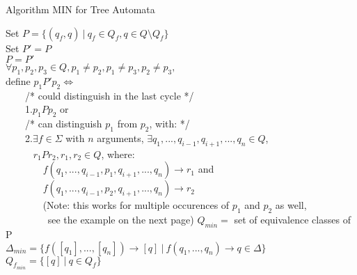 \documentclass{llncs}
\begin{document}
\begin{definition}{Algorithm MIN for Tree Automata} \cite{martens-uni-dortmund-lecture02}\\
	\begin{algorithm}[H]
		Set \(P = \{(q_f, q)~|~q_f \in Q_f, q \in Q \setminus Q_f\}\)\\
		Set \(P' = P\)\\
		 {
			\(P = P'\)\\
			\(\forall p_1, p_2, p_3 \in Q, p_1 \neq p_2, p_1 \neq p_3, p_2 \neq p_3,\)\\
			define \(p_1P'p_2 \iff\)\\
			~~~~/* could distinguish in the last cycle */\\
			~~~~1.\(p_1Pp_2\) or\\
			~~~~/* can distinguish \(p_1\) from \(p_2\), with: */\\
			~~~~2.\(\exists f \in \Sigma\) with \(n\) arguments, \(\exists q_1, ..., q_{i-1}, q_{i+1}, ..., q_n \in Q\), \\
			~~~~~ \(r_1Pr_2, r_1, r_2 \in Q\), where: \\
			~~~~~~~ \(f(q_1, ..., q_{i-1}, p_1, q_{i+1}, ..., q_n) \rightarrow r_1\) and\\
			~~~~~~~ \(f(q_1, ..., q_{i-1}, p_2, q_{i+1}, ..., q_n) \rightarrow r_2\) \\
			~~~~~~~ (Note: this works for multiple occurences of \(p_1\) and \(p_2\) as well, \\
			~~~~~~~~ see the example on the next page)
		}
		\(Q_{min} = \) set of equivalence classes of P \\
		\(\Delta_{min} = \{f([q_1], ..., [q_n]) \rightarrow [q]~|~f(q_1, ..., q_n) \rightarrow q \in \Delta\}\)\\
		\(Q_{f_{min}} = \{[q]~|~q \in Q_f\}\)\\
	\end{algorithm}
\end{definition}

\pagebreak
\end{document}

